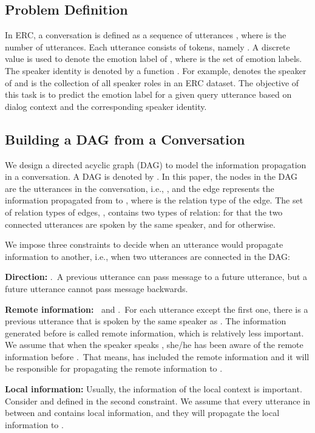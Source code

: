 \documentclass[11pt,a4paper]{article}
\begin{document}
\subsection{Problem Definition}

In ERC, a conversation is defined as a sequence of utterances , where  is the number of utterances. Each utterance  consists of  tokens, namely . A discrete value  is used to denote the emotion label of , where  is the set of emotion labels. The speaker identity is denoted by a function . For example,  denotes the speaker of  and  is the collection of all speaker roles in an ERC dataset. The objective of this task is to predict the emotion label  for a given query utterance  based on dialog context  and the corresponding speaker identity. 


\subsection{Building a DAG from a Conversation}\label{sec:build_dag}
We design a directed acyclic graph (DAG) to model the information propagation in a conversation. A DAG is denoted by . In this paper, the nodes in the DAG are the utterances in the conversation, i.e., , and the edge  represents the information propagated from  to , where  is the relation type of the edge. The set of relation types of edges, , contains two types of relation:  for that the two connected utterances are spoken by the same speaker, and  for otherwise.

We impose three constraints to decide when an utterance would propagate information to another, i.e., when two utterances are connected in the DAG:



\noindent
\textbf{Direction:} .~A previous utterance can pass message to a future utterance, but a future utterance cannot pass message backwards.

\noindent
\textbf{Remote information:~} and .~For each utterance  except the first one, there is a previous utterance  that is spoken by the same speaker as . The information generated before  is called remote information, which is relatively less important.
We assume that when the speaker speaks , she/he has been aware of the remote information before .~That means,  has included the remote information and it will be responsible for propagating the remote information to .

\noindent
\textbf{Local information: }
Usually, the information of the local context is important. Consider  and  defined in the second constraint. We assume that every utterance  in between  and  contains local information, and they will propagate the local information to .
\end{document}
